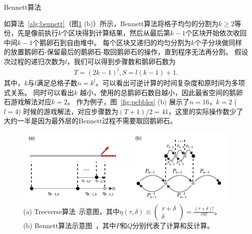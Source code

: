 \documentclass[A4,twoside,UTF8]{ctexart}
\begin{document}
\begin{algorithm}
    \SetAlgoLined
    \DontPrintSemicolon
    \caption{Bennett算法}\label{alg:bennett}
\end{algorithm}
如算法~\ref{alg:bennett}（图\ref{fig:tradeoff} (b)）所示，Bennett算法将格子均匀的分割为$k\geq 2$等份，先是像前执行$k$个区块得到计算结果，然后从最后第$k-1$个区块开始依次收回中间$k-1$个鹅卵石到自由堆中。
每个区块又递归的均匀分割为$k$个子分块做同样的放置鹅卵石-保留最后的鹅卵石-取回鹅卵石的操作，直到程序无法再分割。
假设次过程的递归次数为$l$，我们可以得到步骤数和鹅卵石数为
\begin{align}\label{eq:rev}
    T = (2k-1)^l, S = l(k-1)+1.
\end{align}
其中，$k$与$l$满足总格子数$n = k^l$。可以看出可逆计算的时间复杂度和原时间为多项式关系。
同时可以看出$k$ 越小，使用的总鹅卵石数目越小，因此最省空间的鹅卵石游戏解法对应$k=2$。
作为例子，图~\ref{fig:pebbles} (b) 展示了$n=16$，$k=2$ ($l=4$) 时候的游戏解法，对应步骤数为$(T+1)/2 = 41$，这里的实际操作数少了大约一半是因为最外层的Bennett过程不需要取回鹅卵石。

\begin{figure}
    \centerline{\includegraphics[width=0.88\columnwidth,trim={0 0cm 0 0cm},clip]{tradeoff2.pdf}}
    \caption{(a) Treeverse算法~\cite{Griewank1992}示意图，其中$\eta(\tau, \delta) \equiv \left(\begin{matrix} \tau + \delta \\ \delta \end{matrix}\right)=\frac{(\tau+\delta)!}{\tau!\delta!}$。(b) Bennett算法示意图~\cite{Bennett1973,Levine1990}，其中$P$和$Q$分别代表了计算和反计算。}\label{fig:tradeoff}
\end{figure}
\end{document}

